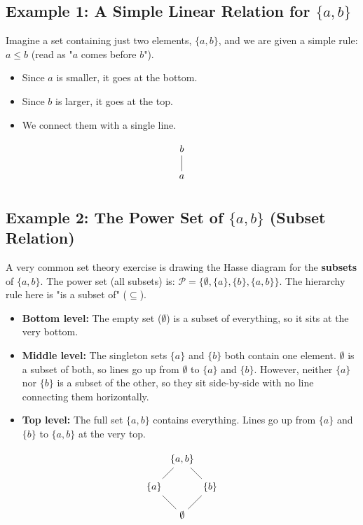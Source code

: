 \documentclass{article}
\begin{document}
\subsection*{Example 1: A Simple Linear Relation for $\{a, b\}$}
Imagine a set containing just two elements, $\{a, b\}$, and we are given a simple rule: $a \le b$ (read as "$a$ comes before $b$"). 
\begin{itemize}
    \item Since $a$ is smaller, it goes at the bottom.
    \item Since $b$ is larger, it goes at the top.
    \item We connect them with a single line.
\end{itemize}

\[
\begin{tikzpicture}
    \node (b) at (0,1) {$b$};
    \node (a) at (0,0) {$a$};

    \draw (b) -- (a);
\end{tikzpicture}
\]
\newpage
\subsection*{Example 2: The Power Set of $\{a, b\}$ (Subset Relation)}
A very common set theory exercise is drawing the Hasse diagram for the \textbf{subsets} of $\{a, b\}$. 
The power set (all subsets) is: $\mathcal{P} = \{\emptyset, \{a\}, \{b\}, \{a, b\}\}$. The hierarchy rule here is "is a subset of" ($\subseteq$).

\begin{itemize}
    \item \textbf{Bottom level:} The empty set ($\emptyset$) is a subset of everything, so it sits at the very bottom.
    \item \textbf{Middle level:} The singleton sets $\{a\}$ and $\{b\}$ both contain one element. $\emptyset$ is a subset of both, so lines go up from $\emptyset$ to $\{a\}$ and $\{b\}$. However, neither $\{a\}$ nor $\{b\}$ is a subset of the other, so they sit side-by-side with no line connecting them horizontally.
    \item \textbf{Top level:} The full set $\{a, b\}$ contains everything. Lines go up from $\{a\}$ and $\{b\}$ to $\{a, b\}$ at the very top.
\end{itemize}

\[
\begin{tikzpicture}
\node (ab) at (0,2) {$\{a,b\}$};
\node (a)  at (-1,1) {$\{a\}$};
\node (b)  at (1,1) {$\{b\}$};
\node (e)  at (0,0) {$\emptyset$};

\draw (ab) -- (a);
\draw (ab) -- (b);
\draw (a) -- (e);
\draw (b) -- (e);
\end{tikzpicture}
\]
\end{document}
